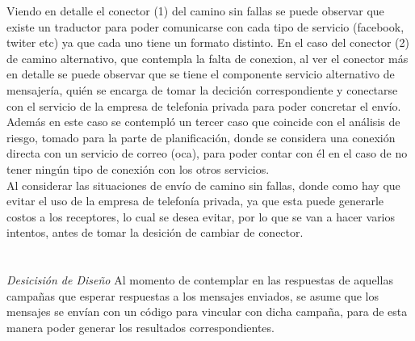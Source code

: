 \documentclass[a4paper, 11pt]{article}
\begin{document}
Viendo en detalle el conector (1) del camino sin fallas se puede observar que existe un traductor para poder comunicarse con cada tipo de servicio (facebook, twiter etc) ya que cada uno tiene un formato distinto.
En el caso del conector (2) de camino alternativo, que contempla la falta de conexion, al ver el conector más en detalle se puede observar  que se tiene el componente servicio alternativo de mensajería, quién se encarga de tomar la decición correspondiente y conectarse con el servicio de la empresa de telefonia privada para poder concretar el envío.\\

Además en este caso se contempló un tercer caso que coincide con el análisis de riesgo, tomado para la parte de planificación, donde se considera una conexión directa con un servicio de correo (oca), para poder contar con él en el caso de no tener ningún tipo de conexión con los otros servicios.\\ %

Al considerar las situaciones de envío de camino sin fallas, donde como hay que evitar el uso de la empresa de telefonía privada, ya que esta puede generarle costos a los receptores, lo cual se desea evitar, por lo que se van a hacer varios intentos, antes de tomar la desición de cambiar de conector.\\
\\
\\
\emph{Desicisión de Diseño}
Al momento de contemplar en las respuestas de aquellas campañas que esperar respuestas a los mensajes enviados, se asume que los mensajes se envían con un código para vincular con dicha campaña, para de esta manera poder generar los resultados correspondientes.\\
\end{document}
